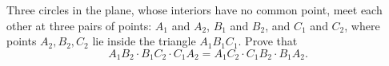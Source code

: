 Three circles in the plane, whose interiors have no common point, meet each other at three pairs of points: $A_1$ and $A_2$,  $B_1$ and $B_2$,  and $C_1$ and $C_2$,  where points $A_2,B_2,C_2$ lie inside the triangle $A_1B_1C_1$. Prove that\[A_1B_2 \cdot B_1C_2 \cdot C_1A_2 = A_1C_2 \cdot C_1B_2 \cdot B_1A_2 .\]